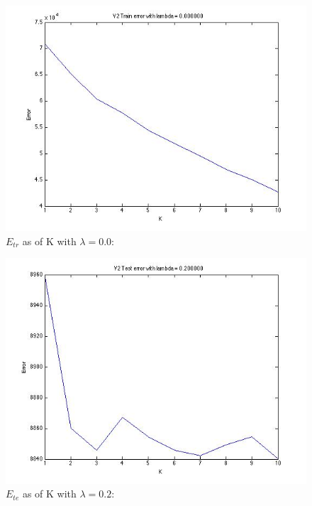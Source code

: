 \documentclass{article}
\begin{document}
\begin{figure}[H]
\centering
\includegraphics[scale=0.5]{TrainErrorLambda0-V2.jpg}
\caption{ $E_{tr}$ as of K with $\lambda=0.0$:}
\label{}
\end{figure}

\begin{figure}[H]
\centering
\includegraphics[scale=0.5]{TestErrorLambda02-V2.jpg}
\caption{ $E_{te}$ as of K with $\lambda=0.2$:}
\label{}
\end{figure}
\end{document}
